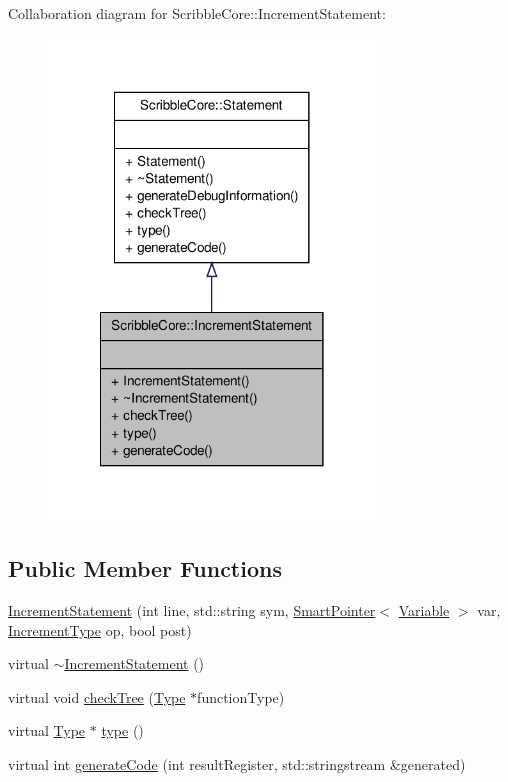 Collaboration diagram for Scribble\-Core\-:\-:Increment\-Statement\-:
\nopagebreak
\begin{figure}[H]
\begin{center}
\leavevmode
\includegraphics[width=246pt]{class_scribble_core_1_1_increment_statement__coll__graph}
\end{center}
\end{figure}
\subsection*{Public Member Functions}
\begin{DoxyCompactItemize}
\item 
\hyperlink{class_scribble_core_1_1_increment_statement_aad8c51d7b0491659f6bbce01cf319e94}{Increment\-Statement} (int line, std\-::string sym, \hyperlink{_smart_pointer_8hpp_afdd8d4ba81c3fcbdeacf1dafba2accfb}{Smart\-Pointer}$<$ \hyperlink{class_scribble_core_1_1_variable}{Variable} $>$ var, \hyperlink{namespace_scribble_core_afecba7a67c8d5e38ef80498d746b4ec9}{Increment\-Type} op, bool post)
\item 
virtual \hyperlink{class_scribble_core_1_1_increment_statement_a0562dc7563832abafb8c1cec6c528c20}{$\sim$\-Increment\-Statement} ()
\item 
virtual void \hyperlink{class_scribble_core_1_1_increment_statement_adbdd48535f60f2b10ecda7988995bca0}{check\-Tree} (\hyperlink{class_scribble_core_1_1_type}{Type} $\ast$function\-Type)
\item 
virtual \hyperlink{class_scribble_core_1_1_type}{Type} $\ast$ \hyperlink{class_scribble_core_1_1_increment_statement_a61a016b7be20f61dd62f3ce9d14ac2a3}{type} ()
\item 
virtual int \hyperlink{class_scribble_core_1_1_increment_statement_a62aa6d2006e1f4e4cc4449be58ebbdea}{generate\-Code} (int result\-Register, std\-::stringstream \&generated)
\end{DoxyCompactItemize}


